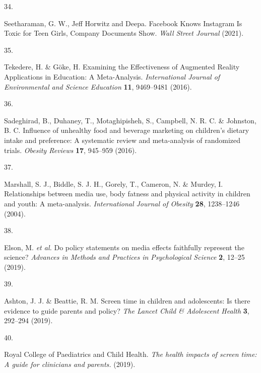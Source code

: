 \documentclass[
  english,
  man]{apa6}
\newlength{\cslhangindent}
\newlength{\csllabelwidth}
\newenvironment{CSLReferences}[2] %
 {%
  \setlength{\parindent}{0pt}
  \ifodd #1 \everypar{\setlength{\hangindent}{\cslhangindent}}\ignorespaces\fi
  \ifnum #2 > 0
  \setlength{\parskip}{#2\baselineskip}
  \fi
 }%
 {}
\newcommand{\CSLLeftMargin}[1]{\parbox[t]{\csllabelwidth}{#1}}
\newcommand{\CSLRightInline}[1]{\parbox[t]{\linewidth - \csllabelwidth}{#1}\break}
\begin{document}
\begin{CSLReferences}{0}{0}
\leavevmode{}%
\CSLLeftMargin{34. }
\CSLRightInline{Seetharaman, G. W., Jeff Horwitz and Deepa. Facebook {Knows Instagram Is Toxic} for {Teen Girls}, {Company Documents Show}. \emph{Wall Street Journal} (2021).}

\leavevmode{}%
\CSLLeftMargin{35. }
\CSLRightInline{Tekedere, H. \& Göke, H. Examining the {Effectiveness} of {Augmented Reality Applications} in {Education}: {A Meta-Analysis}. \emph{International Journal of Environmental and Science Education} \textbf{11}, 9469--9481 (2016).}

\leavevmode{}%
\CSLLeftMargin{36. }
\CSLRightInline{Sadeghirad, B., Duhaney, T., Motaghipisheh, S., Campbell, N. R. C. \& Johnston, B. C. Influence of unhealthy food and beverage marketing on children's dietary intake and preference: A systematic review and meta-analysis of randomized trials. \emph{Obesity Reviews} \textbf{17}, 945--959 (2016).}

\leavevmode{}%
\CSLLeftMargin{37. }
\CSLRightInline{Marshall, S. J., Biddle, S. J. H., Gorely, T., Cameron, N. \& Murdey, I. Relationships between media use, body fatness and physical activity in children and youth: A meta-analysis. \emph{International Journal of Obesity} \textbf{28}, 1238--1246 (2004).}

\leavevmode{}%
\CSLLeftMargin{38. }
\CSLRightInline{Elson, M. \emph{et al.} Do policy statements on media effects faithfully represent the science? \emph{Advances in Methods and Practices in Psychological Science} \textbf{2}, 12--25 (2019).}

\leavevmode{}%
\CSLLeftMargin{39. }
\CSLRightInline{Ashton, J. J. \& Beattie, R. M. Screen time in children and adolescents: Is there evidence to guide parents and policy? \emph{The Lancet Child \& Adolescent Health} \textbf{3}, 292--294 (2019).}

\leavevmode{}%
\CSLLeftMargin{40. }
\CSLRightInline{Royal College of Paediatrics and Child Health. \emph{The health impacts of screen time: {A} guide for clinicians and parents.} (2019).}


\end{CSLReferences}
\end{document}
